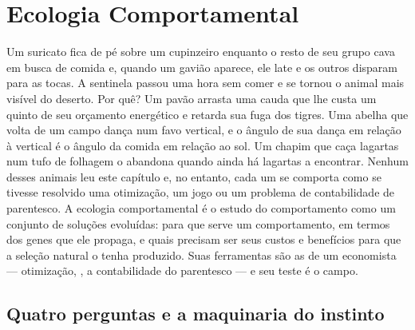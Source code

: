 \chapter{Ecologia Comportamental}\label{ch:b3:behavioural-ecology}

Um suricato fica de pé sobre um cupinzeiro enquanto o resto de seu grupo
cava em busca de comida e, quando um gavião aparece, ele late e os outros
disparam para as tocas. A sentinela passou uma hora sem comer e se tornou
o animal mais visível do deserto. Por quê? Um pavão arrasta uma cauda que
lhe custa um quinto de seu orçamento energético e retarda sua fuga dos
tigres. Uma abelha que volta de um campo dança num favo vertical, e o
ângulo de sua dança em relação à vertical é o ângulo da comida em relação
ao sol. Um chapim que caça lagartas num tufo de folhagem o abandona
quando ainda há lagartas a encontrar. Nenhum desses animais leu este
capítulo e, no entanto, cada um se comporta como se tivesse resolvido uma
otimização, um jogo ou um problema de contabilidade de parentesco. A
ecologia comportamental é o estudo do comportamento como um conjunto de
soluções evoluídas: para que serve um comportamento, em termos dos genes
que ele propaga, e quais precisam ser seus custos e benefícios para que a
seleção natural o tenha produzido. Suas ferramentas são as de um
economista --- otimização, , a contabilidade do
parentesco --- e seu teste é o campo.

\section{Quatro perguntas e a maquinaria do instinto}

